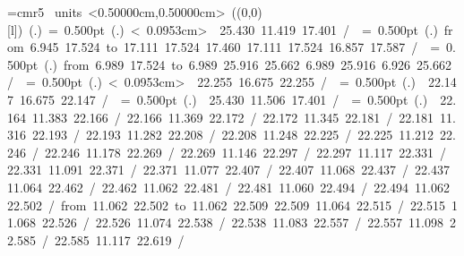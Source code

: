 \font\thinlinefont=cmr5
%
\begingroup\makeatletter\ifx\SetFigFont\undefined%
\gdef\SetFigFont#1#2#3#4#5{%
  \reset@font\fontsize{#1}{#2pt}%
  \fontfamily{#3}\fontseries{#4}\fontshape{#5}%
  \selectfont}%
\fi\endgroup%
\mbox{\beginpicture
\setcoordinatesystem units <0.50000cm,0.50000cm>
\unitlength=0.10000cm
\linethickness=1pt
\setplotsymbol ({\makebox(0,0)[l]{\tencirc{}}})
\setshadesymbol ({\thinlinefont .})
\setlinear
%
%
\linethickness= 0.500pt
\setplotsymbol ({\thinlinefont .})
\setdots < 0.0953cm>
{\color[rgb]{0,0,0} 25.430 11.419 17.401 /
}%
%
%
\linethickness= 0.500pt
\setplotsymbol ({\thinlinefont .})
\setsolid
{\color[rgb]{0,0,0}\putrule from  6.945 17.524 to 17.111 17.524
%
%
 17.460 17.111 17.524 16.857 17.587 /
%
}%
%
%
\linethickness= 0.500pt
\setplotsymbol ({\thinlinefont .})
{\color[rgb]{0,0,0}\putrule from  6.989 17.524 to  6.989 25.916
%
%
 25.662  6.989 25.916  6.926 25.662 /
%
}%
%
%
\linethickness= 0.500pt
\setplotsymbol ({\thinlinefont .})
\setdots < 0.0953cm>
{\color[rgb]{0,0,0} 22.255 16.675 22.255 /
}%
%
%
\linethickness= 0.500pt
\setplotsymbol ({\thinlinefont .})
{\color[rgb]{0,0,0} 22.147 16.675 22.147 /
}%
%
%
\linethickness= 0.500pt
\setplotsymbol ({\thinlinefont .})
{\color[rgb]{0,0,0} 25.430 11.506 17.401 /
}%
%
%
\linethickness= 0.500pt
\setplotsymbol ({\thinlinefont .})
\setsolid
{\color[rgb]{0,0,0} 22.164 11.383 22.166 /
 22.166 11.369 22.172 /
 22.172 11.345 22.181 /
 22.181 11.316 22.193 /
 22.193 11.282 22.208 /
 22.208 11.248 22.225 /
 22.225 11.212 22.246 /
 22.246 11.178 22.269 /
 22.269 11.146 22.297 /
 22.297 11.117 22.331 /
 22.331 11.091 22.371 /
 22.371 11.077 22.407 /
 22.407 11.068 22.437 /
 22.437 11.064 22.462 /
 22.462 11.062 22.481 /
 22.481 11.060 22.494 /
 22.494 11.062 22.502 /
\putrule from 11.062 22.502 to 11.062 22.509
 22.509 11.064 22.515 /
 22.515 11.068 22.526 /
 22.526 11.074 22.538 /
 22.538 11.083 22.557 /
 22.557 11.098 22.585 /
 22.585 11.117 22.619 /
}}
